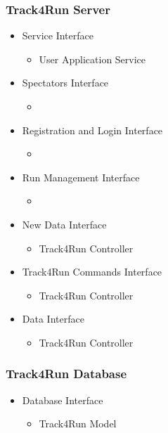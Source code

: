 \documentclass[../../DD.tex]{subfiles}
\begin{document}
		\subsubsection{Track4Run Server}
		\begin{itemize}
			\item Service Interface
			\begin{itemize}
				\item User Application Service 
			\end{itemize}
			\item Spectators Interface
			\begin{itemize}
				\item {}
			\end{itemize}
			\item Registration and Login Interface
			\begin{itemize}
				\item {}
			\end{itemize}
			\item Run Management Interface
			\begin{itemize}
				\item {}
			\end{itemize}
			\item New Data Interface
			\begin{itemize}
				\item Track4Run Controller
			\end{itemize}
			\item Track4Run Commands Interface
			\begin{itemize}
				\item Track4Run Controller
			\end{itemize}
			\item Data Interface
			\begin{itemize}
				\item Track4Run Controller
			\end{itemize}
		\end{itemize}

		\subsubsection{Track4Run Database}
		\begin{itemize}
			\item Database Interface
			\begin{itemize}
				\item Track4Run Model
			\end{itemize}
		\end{itemize}
\end{document}

